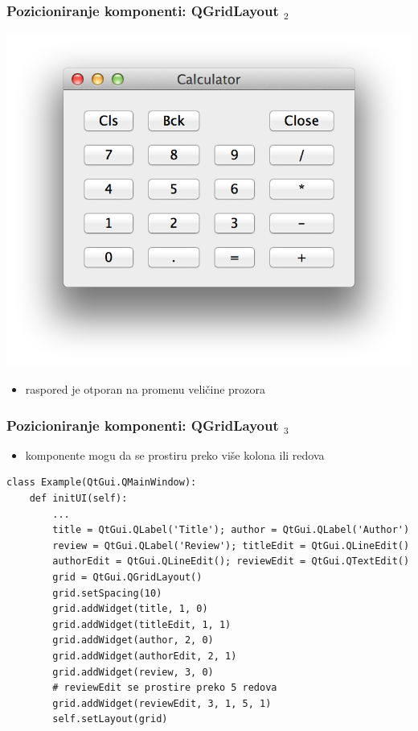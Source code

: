 \documentclass[utf8,compress]{beamer}
\begin{document}
\begin{frame}[fragile]
  \frametitle{Pozicioniranje komponenti: QGridLayout $_2$}
\begin{center}
\includegraphics[scale=0.5]{pyqt08.png}
\end{center}
  \begin{itemize}
    \item raspored je otporan na promenu veličine prozora
  \end{itemize}
\end{frame}

\begin{frame}[fragile,shrink=20]
  \frametitle{Pozicioniranje komponenti: QGridLayout $_3$}
  \begin{itemize}
    \item komponente mogu da se prostiru preko više kolona ili redova
  \end{itemize}
\begin{verbatim}
class Example(QtGui.QMainWindow):
    def initUI(self):
        ...
        title = QtGui.QLabel('Title'); author = QtGui.QLabel('Author')
        review = QtGui.QLabel('Review'); titleEdit = QtGui.QLineEdit()
        authorEdit = QtGui.QLineEdit(); reviewEdit = QtGui.QTextEdit()
        grid = QtGui.QGridLayout()
        grid.setSpacing(10)
        grid.addWidget(title, 1, 0)
        grid.addWidget(titleEdit, 1, 1)
        grid.addWidget(author, 2, 0)
        grid.addWidget(authorEdit, 2, 1)
        grid.addWidget(review, 3, 0)
        # reviewEdit se prostire preko 5 redova
        grid.addWidget(reviewEdit, 3, 1, 5, 1)
        self.setLayout(grid)
\end{verbatim}
\end{frame}
\end{document}
